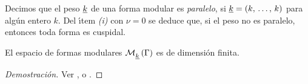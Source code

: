 \begin{obsCuandoNoEsParalelo}\label{obs:cuandonoesparalelo}
	Decimos que el peso $\underline{k}$ de una forma modular es
	\emph{paralelo}, si $\underline{k}=(k,\,\dots,\,k)$
	para alg\'{u}n entero $k$. Del \'{\i}tem \textit{(i)} con $\nu=0$
	se deduce que, si el peso no es paralelo, entonces toda forma
	es cuspidal.
\end{obsCuandoNoEsParalelo}

\begin{teoLaDimEsFinita}\label{thm:ladimensionesfinita}
	El espacio de formas modulares $\mathcal{M}^{}_{\underline{k}}\left(\Gamma\right)$ es de
	dimensi\'{o}n finita.
\end{teoLaDimEsFinita}

\begin{proof}[Demostraci\'{o}n]
	Ver \cite{BruinierFormsAndApplications},
	\cite[\S~I.6 y Ch.~II]{FreitagForms} o
	\cite{vanDerGeerSurfaces}.
\end{proof}

